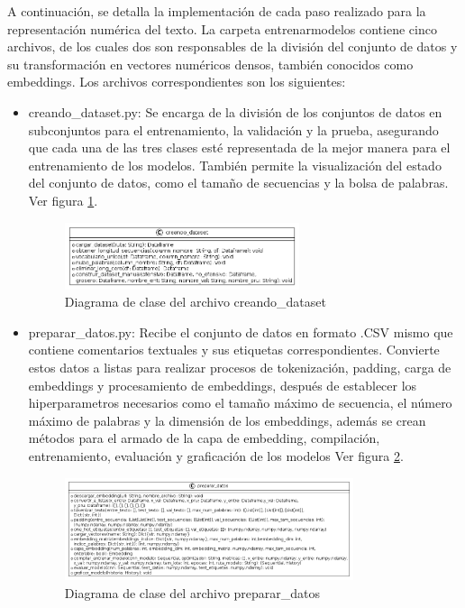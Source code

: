 A continuación, se detalla la implementación de cada paso realizado para la representación numérica del texto. La carpeta entrenarmodelos contiene cinco archivos, de los cuales dos son responsables de la división del conjunto de datos y su transformación en vectores numéricos densos, también conocidos como embeddings. Los archivos correspondientes son los siguientes: 

\begin{itemize}

\item creando\_dataset.py: Se encarga de la división de los conjuntos de datos en subconjuntos para el entrenamiento, la validación y la prueba, asegurando que cada una de las tres clases esté representada de la mejor manera para el entrenamiento de los modelos. También permite la visualización del estado del conjunto de datos, como el tamaño de secuencias y la bolsa de palabras. Ver figura \ref{fig:uml7}.

\begin{figure}
	\includegraphics[width=0.65\textwidth]{capitulo5/figuras/fig7.png}
	\caption{Diagrama de clase del archivo creando\_dataset}
	\label{fig:uml7}
\end{figure}

\item preparar\_datos.py: Recibe el conjunto de datos en formato .CSV mismo que contiene comentarios textuales y sus etiquetas correspondientes. Convierte estos datos a listas para realizar procesos de tokenización, padding, carga de embeddings y procesamiento de embeddings, después de establecer los hiperparametros necesarios como el tamaño máximo de secuencia, el número máximo de palabras y la dimensión de los embeddings, además se crean métodos para el armado de la capa de embedding, compilación, entrenamiento, evaluación y graficación de los modelos Ver figura \ref{fig:uml8}.

\begin{figure}
	\includegraphics[width=0.8\textwidth]{capitulo5/figuras/fig8.png}
	\caption{Diagrama de clase del archivo preparar\_datos}
	\label{fig:uml8}
\end{figure}

\end{itemize}

